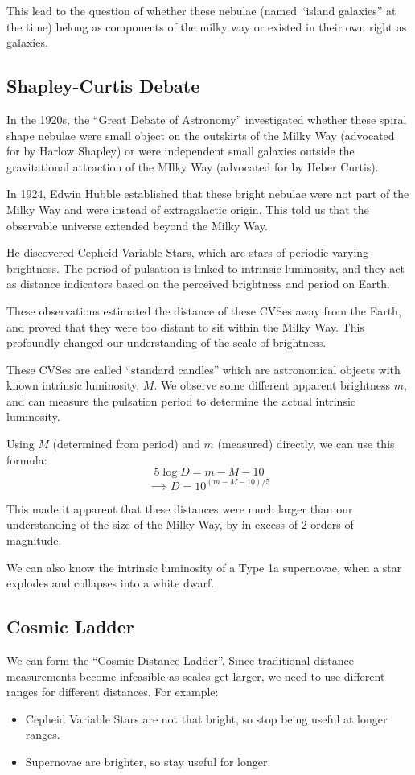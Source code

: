 This lead to the question of whether these nebulae (named ``island galaxies'' at the time) belong as components of the milky way or existed in their own right as galaxies. 

\subsection{Shapley-Curtis Debate}
In the 1920s, the ``Great Debate of Astronomy'' investigated whether these spiral shape nebulae were small object on the outskirts of the Milky Way (advocated for by Harlow Shapley) or were independent small galaxies outside the gravitational attraction of the MIlky Way (advocated for by Heber Curtis).

In 1924, Edwin Hubble established that these bright nebulae were not part of the Milky Way and were instead of extragalactic origin. This told us that the observable universe extended beyond the Milky Way.

He discovered Cepheid Variable Stars, which are stars of periodic varying brightness. The period of pulsation is linked to intrinsic luminosity, and they act as distance indicators based on the perceived brightness and period on Earth.

These observations estimated the distance of these CVSes away from the Earth, and proved that they were too distant to sit within the Milky Way. This profoundly changed our understanding of the scale of brightness.

These CVSes are called ``standard candles'' which are astronomical objects with known intrinsic luminosity, $M$. We observe some different apparent brightness $m$, and can measure the pulsation period to determine the actual intrinsic luminosity.

Using $M$ (determined from period) and $m$ (measured) directly, we can use this formula:
\[
    5 \log D = m - M - 10
\]
\[
    \implies D = 10^{(m - M - 10) / 5}
\]

This made it apparent that these distances were much larger than our understanding of the size of the Milky Way, by in excess of 2 orders of magnitude. 

We can also know the intrinsic luminosity of a Type 1a supernovae, when a star explodes and collapses into a white dwarf.

\subsection{Cosmic Ladder}
We can form the ``Cosmic Distance Ladder''. Since traditional distance measurements become infeasible as scales get larger, we need to use different ranges for different distances. For example:
\begin{itemize}
    \item Cepheid Variable Stars are not that bright, so stop being useful at longer ranges.
    \item Supernovae are brighter, so stay useful for longer.
\end{itemize}

